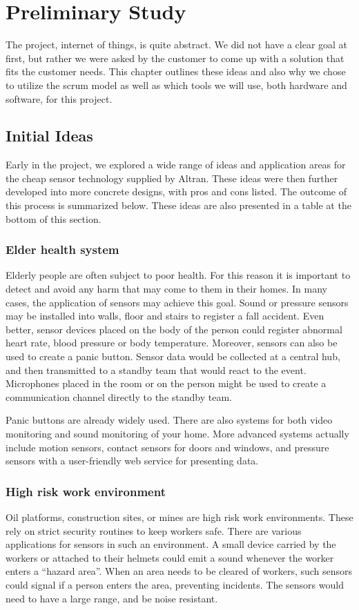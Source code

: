 \documentclass[../document]{subfiles}
\begin{document}
\section{Preliminary Study}
\label{sec:preliminary_study}
The project, internet of things, is quite abstract. We did not have a clear goal at first, but rather we were asked by the customer to come up with a solution that fits the customer needs. This chapter outlines these ideas and also why we chose to utilize the scrum model as well as which tools we will use, both hardware and software, for this project.

\subsection{Initial Ideas}
\label{subsec:initial_ideas}
Early in the project, we explored a wide range of ideas and application areas for the cheap sensor technology supplied by Altran. These ideas were then further developed into more concrete designs, with pros and cons listed. The outcome of this process is summarized below. These ideas are also presented in a table at the bottom of this section.

\subsubsection{Elder health system}
Elderly people are often subject to poor health. For this reason it is important to detect and avoid any harm that may come to them in their homes. In many cases, the application of sensors may achieve this goal. Sound or pressure sensors may be installed into walls, floor and stairs to register a fall accident. Even better, sensor devices placed on the body of the person could register abnormal heart rate, blood pressure or body temperature. Moreover, sensors can also be used to create a panic button. Sensor data would be collected at a central hub, and then transmitted to a standby team that would react to the event. Microphones placed in the room or on the person might be used to create a communication channel directly to the standby team.

Panic buttons are already widely used. There are also systems for both video monitoring and sound monitoring of your home. More advanced systems actually include motion sensors, contact sensors for doors and windows, and pressure sensors with a user-friendly web service for presenting data.

\subsubsection{High risk work environment}
Oil platforms, construction sites, or mines are high risk work environments. These rely on strict security routines to keep workers safe. There are various applications for sensors in such an environment. A small device carried by the workers or attached to their helmets could emit a sound whenever the worker enters a “hazard area”. When an area needs to be cleared of workers, such sensors could signal if a person enters the area, preventing incidents. The sensors would need to have a large range, and be noise resistant.
\end{document}
